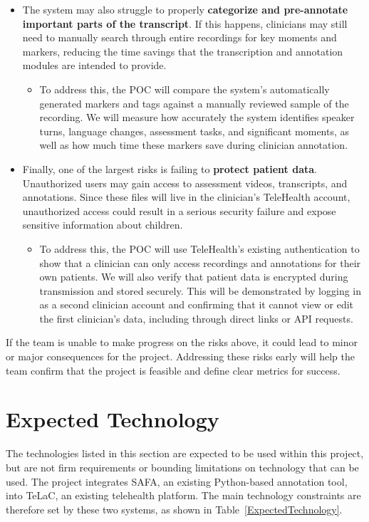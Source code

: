\documentclass{article}
\begin{document}
\begin{itemize}
  \item The system may also struggle to properly \textbf{categorize and pre-annotate
  important parts of the transcript}. If this happens, clinicians may still need to
  manually search through entire recordings for key moments and markers, reducing the
  time savings that the transcription and annotation modules are intended to provide.
  \begin{itemize}
    \item To address this, the POC will compare the system's automatically generated
    markers and tags against a manually reviewed sample of the recording. We will
    measure how accurately the system identifies speaker turns, language changes,
    assessment tasks, and significant moments, as well as how much time these markers
    save during clinician annotation.
  \end{itemize}

  \item Finally, one of the largest risks is failing to \textbf{protect patient data}.
  Unauthorized users may gain access to assessment videos, transcripts, and annotations.
  Since these files will live in the clinician's TeleHealth account, unauthorized access
  could result in a serious security failure and expose sensitive information about
  children.
  \begin{itemize}
    \item To address this, the POC will use TeleHealth's existing authentication to
    show that a clinician can only access recordings and annotations for their own
    patients. We will also verify that patient data is encrypted during transmission
    and stored securely. This will be demonstrated by logging in as a second clinician
    account and confirming that it cannot view or edit the first clinician's data,
    including through direct links or API requests.
  \end{itemize}
\end{itemize}

\noindent If the team is unable to make progress on the risks above, it could lead to
minor or major consequences for the project. Addressing these risks early will help the
team confirm that the project is feasible and define clear metrics for
success.

\section{Expected Technology}

The technologies listed in this section are expected to be used within this project, 
but are not firm requirements or bounding limitations on technology that can be used.
The project integrates SAFA, an existing Python-based annotation tool, into TeLaC, 
an existing telehealth platform. The main technology constraints are therefore set by these two systems,
 as shown in Table~\ref{ExpectedTechnology}.
\end{document}
